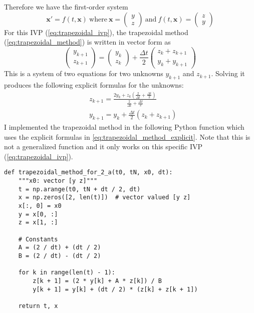 \documentclass{article}
\begin{document}
Therefore we have the first-order system
\begin{equation}
\bm{x}' = f(t, \bm{x})\ \textrm{where}\ \bm{x} = \begin{pmatrix}y \\ z\end{pmatrix}\ \textrm{and}\ f(t,\bm{x}) = \begin{pmatrix}z \\ y\end{pmatrix}
\end{equation}
For this IVP (\ref{eq:trapezoidal_ivp}), the trapezoidal method (\ref{eq:trapezoidal_method}) is written in vector form as
\begin{equation} \label{eq:trapezoidal_method_vector_form}
\begin{pmatrix}y_{k+1} \\ z_{k+1}\end{pmatrix} = \begin{pmatrix}y_k \\ z_k\end{pmatrix} + \frac{\Delta t}{2}\begin{pmatrix}z_k + z_{k+1} \\ y_k + y_{k+1}\end{pmatrix}
\end{equation}
This is a system of two equations for two unknowns \(y_{k+1}\) and \(z_{k+1}\).  Solving it produces the following explicit formulas for the unknowns:
\begin{equation} \label{eq:trapezoidal_method_explicit}
\begin{split}
& z_{k+1} = \frac{2y_k + z_k(\frac{2}{\Delta t} + \frac{\Delta t}{2})}{\frac{2}{\Delta t} + \frac{\Delta t}{2}} \\
& y_{k+1} = y_k + \frac{\Delta t}{2}(z_k + z_{k+1})
\end{split}
\end{equation}
I implemented the trapezoidal method in the following Python function which uses the explicit formulas in \ref{eq:trapezoidal_method_explicit}. Note that this is not a generalized function and it only works on this specific IVP (\ref{eq:trapezoidal_ivp}).
\begin{verbatim}
def trapezoidal_method_for_2_a(t0, tN, x0, dt):
    """x0: vector [y z]"""
    t = np.arange(t0, tN + dt / 2, dt)
    x = np.zeros([2, len(t)])  # vector valued [y z]
    x[:, 0] = x0
    y = x[0, :]
    z = x[1, :]

    # Constants
    A = (2 / dt) + (dt / 2)
    B = (2 / dt) - (dt / 2)

    for k in range(len(t) - 1):
        z[k + 1] = (2 * y[k] + A * z[k]) / B
        y[k + 1] = y[k] + (dt / 2) * (z[k] + z[k + 1])

    return t, x
\end{verbatim}
\end{document}
